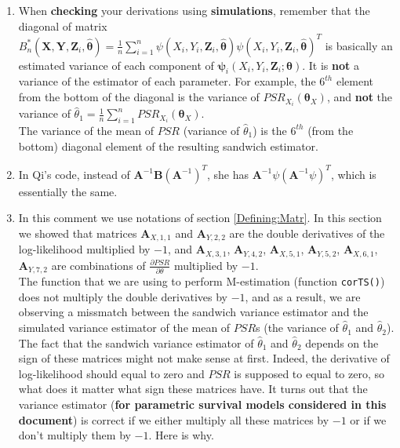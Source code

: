 \documentclass[]{article}
\begin{document}
\begin{enumerate}[1)]
\item
When \textbf{checking} your derivations using \textbf{simulations}, remember that the diagonal of matrix $B^*_n(\pmb{X}, \pmb{Y}, \pmb{Z}_i, \hat{\pmb{\theta}}) = \frac{1}{n} \sum_{i = 1}^{n} \psi(X_i, Y_i, \pmb{Z}_i, \hat{\pmb{\theta}}) \psi(X_i, Y_i, \pmb{Z}_i, \hat{\pmb{\theta}})^T$ is basically an estimated variance of each component of $\pmb{\psi}_i(X_i, Y_i, \pmb{Z}_i; \pmb{\theta})$. It is \textbf{not} a variance of the estimator of each parameter. For example, the $6^{th}$ element from the bottom of the diagonal is the variance of $PSR_{X_{i}}(\pmb{\theta}_X)$, and \textbf{not} the variance of $\hat{\theta}_1 = \frac{1}{n}\sum_{i=1}^{n} PSR_{X_{i}}(\pmb{\theta}_X)$.\\
The variance of the mean of $PSR$ (variance of $\hat{\theta}_1$) is the $6^{th}$ (from the bottom) diagonal element of the resulting sandwich estimator.

\item In Qi's code, instead of $\pmb{A}^{-1}\pmb{B} (\pmb{A}^{-1})^T$, she has $\pmb{A}^{-1}\psi (\pmb{A}^{-1}\psi)^T$, which is essentially the same.\\

\item In this comment we use notations of section \ref{Defining:Matr}. In this section we showed that matrices $\pmb{A}_{X,1,1}$ and $\pmb{A}_{Y,2,2}$ are the double derivatives of the log-likelihood multiplied by $-1$, and  $\pmb{A}_{X,3,1}$, $\pmb{A}_{Y, 4,2}$,  $\pmb{A}_{X,5,1}$, $\pmb{A}_{Y,5,2}$, $\pmb{A}_{X,6,1}$, $\pmb{A}_{Y, 7,2}$ are combinations of $\frac{\partial PSR}{\partial \theta}$  multiplied by $-1$.\\
The function that we are using to perform M-estimation (function \texttt{corTS()}) does not multiply the double derivatives by $-1$, and as a result, we are observing a missmatch between the sandwich variance estimator and the simulated variance estimator of the mean of $PSR$s (the variance of $\hat{\theta}_1$ and $\hat{\theta}_2$).\\
The fact that the sandwich variance estimator of $\hat{\theta}_1$ and $\hat{\theta}_2$ depends on the sign of these matrices might not make sense at first. Indeed, the derivative of log-likelihood should equal to zero and $PSR$ is supposed to equal to zero, so what does it matter what sign these matrices have. It turns out that the variance estimator (\textbf{for parametric survival models considered in this document}) is correct if we either multiply all these matrices by $-1$ or if we don't multiply them by $-1$. Here is why.\\


\end{enumerate}
\end{document}
